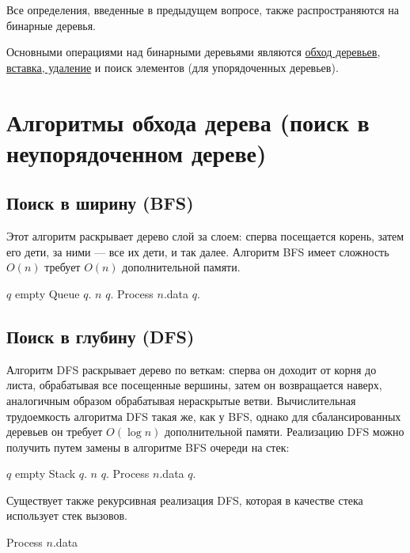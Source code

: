 Все определения, введенные в предыдущем вопросе, также распространяются на бинарные деревья.

Основными операциями над бинарными деревьями являются \hyperref[sec:bintree-traversal]{обход деревьев},
\hyperref[sec:tree-ins-del]{вставка, удаление} и поиск элементов (для упорядоченных деревьев).

\section{Алгоритмы обхода дерева (поиск в неупорядоченном дереве)}
\label{sec:tree-traversal}

\subsection{Поиск в ширину (BFS)}
Этот алгоритм раскрывает дерево слой за слоем:
сперва посещается корень, затем его дети, за ними ---
все их дети, и так далее. Алгоритм BFS имеет сложность $O(n)$ требует
$O(n)$ дополнительной памяти.
\begin{algorithmic}
  \State $q$ \asgn empty Queue
  \State $q$.
    \State $n$ \asgn $q$.
    \State Process $n$.data
      $q$.
    \EndFor
  \EndWhile
\EndProcedure
\end{algorithmic}

\subsection{Поиск в глубину (DFS)}
Алгоритм DFS раскрывает дерево по веткам: сперва он доходит от корня до листа,
обрабатывая все посещенные вершины, затем он возвращается наверх, аналогичным
образом обрабатывая нераскрытые ветви. Вычислительная трудоемкость алгоритма
DFS такая же, как у BFS, однако для сбалансированных деревьев он требует $O(\log n)$
дополнительной памяти.
Реализацию DFS можно получить путем замены в алгоритме BFS очереди на стек:
\begin{algorithmic}
  \State $q$ \asgn empty Stack
  \State $q$.
    \State $n$ \asgn $q$.
    \State Process $n$.data
      $q$.
    \EndFor
  \EndWhile
\EndProcedure
\end{algorithmic}

Существует также рекурсивная реализация DFS, которая в качестве стека использует
стек вызовов.
\begin{algorithmic}
  \State Process $n$.data
    \State {}
  \EndFor
\EndProcedure
\end{algorithmic}

